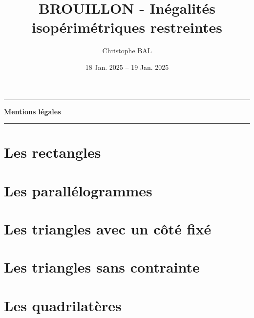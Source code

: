 \documentclass[12pt]{amsart}
\begin{document}
\title{BROUILLON - Inégalités isopérimétriques restreintes}
\author{Christophe BAL}
\date{18 Jan. 2025 -- 19 Jan. 2025}
\maketitle


\begin{center}
	\hrule\vspace{.3em}
	{
		\fontsize{1.35em}{1em}\selectfont
		\textbf{Mentions \og légales \fg}
	}
			
	\vspace{0.45em}
	\doclicenseThis
	\hrule
\end{center}



\setcounter{tocdepth}{2}
\tableofcontents




\newpage
\section{Les rectangles}






\section{Les parallélogrammes}






\section{Les triangles avec un côté fixé}






\section{Les triangles sans contrainte}






\section{Les quadrilatères}


\end{document}
